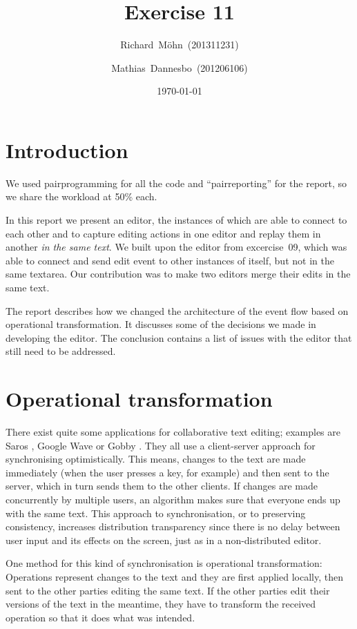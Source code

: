 \documentclass[a4paper,draft,12pt,oneside,article,table]{memoir}
\newcommand{\supertitle}[1]{\gdef\suP{#1}}
\newcommand{\subtitle}[1]{\gdef\suB{#1}}
\newcommand{\stunum}[1]{\gdef\stuN{#1}}
\begin{document}
\supertitle{Distributed Systems}
\title{Exercise 11}
\author{Richard~Möhn~\small{(201311231)} \and Mathias~Dannesbo~\small{(201206106)}}
\date{\today}
\maketitle

\chapter{Introduction}
We used pairprogramming for all the code and ``pairreporting'' for the
report, so we share the workload at 50\% each.

In this report we present an editor, the instances of which are able to
connect to each other and to capture editing actions in one editor and
replay them in another \textit{in the same text}.  We built upon the
editor from excercise~09, which was able to connect and send edit event
to other instances of itself, but not in the same textarea. Our
contribution was to make two editors merge their edits in the same
text.

The report describes how we changed the architecture of the event flow
based on operational transformation. It discusses some of the
decisions we made in developing the editor. The conclusion contains a
list of issues with the editor that still need to be addressed.

\chapter{Operational transformation}

There exist quite some applications for collaborative text editing;
examples are Saros \cite{Saros}, Google Wave \cite{GoogleWave} or Gobby
\cite{Gobby}. They all use a client-server approach for synchronising
optimistically. This means, changes to the text are made immediately
(when the user presses a key, for example) and then sent to the server,
which in turn sends them to the other clients. If changes are made
concurrently by multiple users, an algorithm makes sure that everyone
ends up with the same text. This approach to synchronisation, or to
preserving consistency, increases distribution transparency since there
is no delay between user input and its effects on the screen, just as in
a non-distributed editor. 

One method for this kind of synchronisation is operational
transformation: Operations represent changes to the text and they are
first applied locally, then sent to the other parties editing the same
text. If the other parties edit their versions of the text in the
meantime, they have to transform the received operation so that it does
what was intended.
\end{document}
